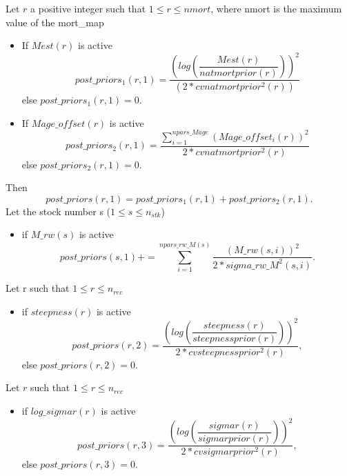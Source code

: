 \documentclass{article}
\begin{document}
    
    Let $r$ a positive integer such that $1\leq r \leq nmort$, where nmort is the maximum value of the mort\_map
    \begin{itemize}
        \item If $Mest(r)$ is active
        \begin{equation}
            post\_priors_1(r,1) = \dfrac{\left(log\left(\dfrac{Mest(r)}{natmortprior(r)}\right)\right)^2}{(2*cvnatmortprior^2(r))}
        \end{equation}
        else $post\_priors_1(r,1)=0$.
        \item If $Mage\_offset(r)$ is active
        \begin{equation}
            post\_priors_2(r,1) = \dfrac{\displaystyle\sum_{i=1}^{npars\_Mage}(Mage\_offset_i(r))^2}{2*cvnatmortprior^2(r)}
        \end{equation}
        else $post\_priors_2(r,1)=0$. 
    \end{itemize}
    Then
        \begin{equation}
            post\_priors(r,1)=post\_priors_1(r,1)+post\_priors_2(r,1).
        \end{equation}
    Let the stock number s ($1\leq s \leq n_{stk}$)
    \begin{itemize}
        \item if $M\_rw(s)$ is active
        \begin{equation}
             post\_priors(s,1) 
 +=  \sum_{i=1}^{npars\_rw\_M(s)}\dfrac{(M\_rw(s,i))^2}{2*sigma\_rw\_M^2(s,i)}.
        \end{equation}
    \end{itemize}
    Let r such that $1\leq r \leq n_{rec}$
    \begin{itemize}
        \item if $steepness(r)$ is active
        \begin{equation}
            post\_priors(r,2) = \dfrac{\left(log\left(\dfrac{steepness(r)}{steepnessprior(r)}\right)\right)^2}{2*cvsteepnessprior^2(r)},
        \end{equation}
        else $post\_priors(r,2)=0$.
    \end{itemize}
    Let $r$ such that $1\leq r \leq n_{rec}$
    \begin{itemize}
        \item if $log\_sigmar(r)$ is active
        \begin{equation}
            post\_priors(r,3) = \dfrac{\left(log\left(\dfrac{sigmar(r)}{sigmarprior(r)}\right)\right)^2}{2*cvsigmarprior^2(r)},
        \end{equation}
        else $post\_priors(r,3)=0$.
    \end{itemize}
\end{document}
